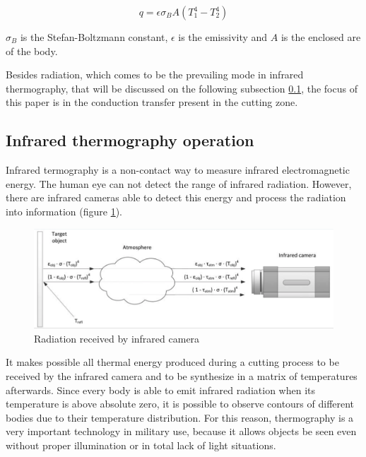 	\begin{equation} 
	\label{}
	q = \epsilon \sigma_{B}A(T_{1}^{4} - T_{2}^{4})
	\end{equation}

	$\sigma_{B}$ is the Stefan-Boltzmann constant, $\epsilon$ is the emissivity and $A$ is the enclosed are of the body.

	Besides radiation, which comes to be the prevailing mode in infrared thermography, that will be discussed on the following subsection \ref{subsec:infraOp}, the focus of this paper is in the conduction transfer present in the cutting zone.

	\subsection{Infrared thermography operation}
	\label{subsec:infraOp}

	Infrared termography is a non-contact way to measure infrared electromagnetic energy. The human eye can not detect the range of infrared radiation. However, there are infrared cameras able to detect this energy and process the radiation into information (figure \ref{fig:thermog}).

	\begin{figure}[H]
		\centering
		\captionsetup{justification=centering}
		\includegraphics[scale=0.5]{Imagens/thermography.png}
		\caption{Radiation received by infrared camera \cite{usamentiaga2014}}
		\label{fig:thermog}
	\end{figure}

	It makes possible all thermal energy produced during a cutting process to be received by the infrared camera and to be synthesize in a matrix of temperatures afterwards. Since every body is able to emit infrared radiation when its temperature is above absolute zero, it is possible to observe contours of different bodies due to their temperature distribution. For this reason, thermography is a very important technology in military use, because it allows objects be seen even without proper illumination or in total lack of light situations.

